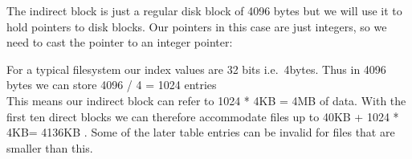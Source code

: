 \begin{Shaded}
\begin{Highlighting}[]
 
 \NormalTok{[}\NormalTok{] directblocks; }
  
  
\NormalTok{\}}
\end{Highlighting}
\end{Shaded}

The indirect block is just a regular disk block of 4096 bytes but we
will use it to hold pointers to disk blocks. Our pointers in this case
are just integers, so we need to cast the pointer to an integer pointer:

\begin{Shaded}
\begin{Highlighting}[]
  
  \NormalTok{(}\NormalTok{)==}\NormalTok{); }
    \NormalTok{+ }\NormalTok{); }

  \NormalTok{)}
      
  

  
   \NormalTok{table[ block_count - } \NormalTok{];}
\NormalTok{\}}
\end{Highlighting}
\end{Shaded}

For a typical filesystem our index values are 32 bits i.e.~4bytes. Thus
in 4096 bytes we can store 4096 / 4 = 1024 entries\\This means our
indirect block can refer to 1024 * 4KB = 4MB of data. With the first ten
direct blocks we can therefore accommodate files up to 40KB + 1024 *
4KB= 4136KB . Some of the later table entries can be invalid for files
that are smaller than this.

